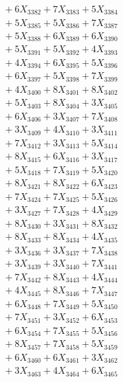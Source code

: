 \documentclass[a4paper,10pt]{article}
\begin{document}
{\begin{align}
&\;  + 6 X_{3382} + 7 X_{3383} + 5 X_{3384} \\[0.3ex]
&\;  + 5 X_{3385} + 5 X_{3386} + 7 X_{3387} \\[0.3ex]
&\;  + 5 X_{3388} + 6 X_{3389} + 6 X_{3390} \\[0.3ex]
&\;  + 5 X_{3391} + 5 X_{3392} + 4 X_{3393} \\[0.3ex]
&\;  + 4 X_{3394} + 6 X_{3395} + 5 X_{3396} \\[0.3ex]
&\;  + 6 X_{3397} + 5 X_{3398} + 7 X_{3399} \\[0.5ex]\allowbreak
&\;  + 4 X_{3400} + 8 X_{3401} + 8 X_{3402} \\[0.3ex]
&\;  + 5 X_{3403} + 8 X_{3404} + 3 X_{3405} \\[0.3ex]
&\;  + 6 X_{3406} + 3 X_{3407} + 7 X_{3408} \\[0.3ex]
&\;  + 3 X_{3409} + 4 X_{3410} + 3 X_{3411} \\[0.3ex]
&\;  + 7 X_{3412} + 3 X_{3413} + 5 X_{3414} \\[0.3ex]
&\;  + 8 X_{3415} + 6 X_{3416} + 3 X_{3417} \\[0.3ex]
&\;  + 5 X_{3418} + 7 X_{3419} + 5 X_{3420} \\[0.3ex]
&\;  + 8 X_{3421} + 8 X_{3422} + 6 X_{3423} \\[0.3ex]
&\;  + 7 X_{3424} + 7 X_{3425} + 5 X_{3426} \\[0.3ex]
&\;  + 3 X_{3427} + 7 X_{3428} + 4 X_{3429} \\[0.5ex]\allowbreak
&\;  + 8 X_{3430} + 3 X_{3431} + 8 X_{3432} \\[0.3ex]
&\;  + 8 X_{3433} + 8 X_{3434} + 4 X_{3435} \\[0.3ex]
&\;  + 3 X_{3436} + 3 X_{3437} + 7 X_{3438} \\[0.3ex]
&\;  + 3 X_{3439} + 3 X_{3440} + 7 X_{3441} \\[0.3ex]
&\;  + 7 X_{3442} + 8 X_{3443} + 4 X_{3444} \\[0.3ex]
&\;  + 4 X_{3445} + 8 X_{3446} + 7 X_{3447} \\[0.3ex]
&\;  + 6 X_{3448} + 7 X_{3449} + 5 X_{3450} \\[0.3ex]
&\;  + 7 X_{3451} + 3 X_{3452} + 6 X_{3453} \\[0.3ex]
&\;  + 6 X_{3454} + 7 X_{3455} + 5 X_{3456} \\[0.3ex]
&\;  + 8 X_{3457} + 7 X_{3458} + 5 X_{3459} \\[0.5ex]\allowbreak
&\;  + 6 X_{3460} + 6 X_{3461} + 3 X_{3462} \\[0.3ex]
&\;  + 3 X_{3463} + 4 X_{3464} + 6 X_{3465} \\[0.3ex]

\end{align}}
\end{document}
